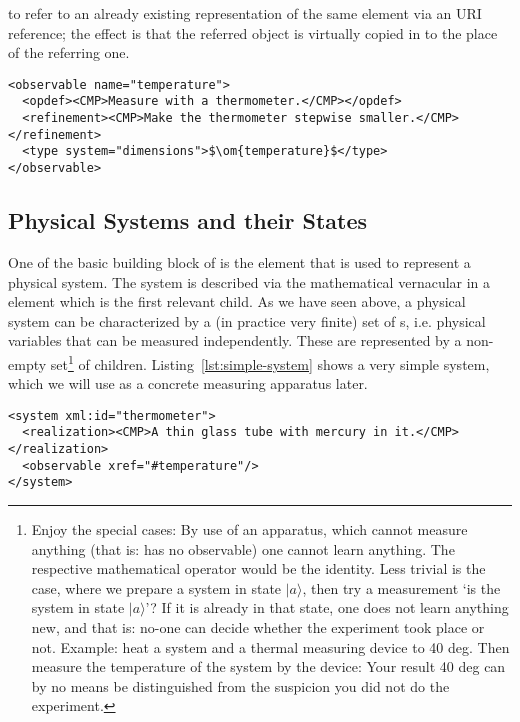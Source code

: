 to refer to an already existing representation of the same element via an URI reference;
the effect is that the referred object is virtually copied in to the place of the
referring one.

\begin{lstlisting}[label=lst:observable,mathescape,
  caption={An Observable for the Temperature},
  index={observable,opdef,refinement,type}]
<observable name="temperature">
  <opdef><CMP>Measure with a thermometer.</CMP></opdef>
  <refinement><CMP>Make the thermometer stepwise smaller.</CMP></refinement>
  <type system="dimensions">$\om{temperature}$</type>
</observable>
\end{lstlisting}


\subsection{Physical Systems and their States}\label{subsec:systems}

One of the basic building block of {\physml} is the {} element that is used
to represent a physical system. The system is described via the mathematical vernacular in
a {} element which is the first relevant child. As we have seen above,
a physical system can be characterized by a (in practice very finite) set of
{s}, i.e. physical variables that can be measured independently.
These are represented by a non-empty set\footnote{Enjoy the special cases: By use of an
  apparatus, which cannot measure anything (that is: has no observable) one cannot learn
  anything. The respective mathematical operator would be the identity.  Less trivial is
  the case, where we prepare a system in state $|a\rangle$, then try a measurement `is the
  system in state $|a\rangle$'? If it is already in that state, one does not learn
  anything new, and that is: no-one can decide whether the experiment took place or not.
  Example: heat a system and a thermal measuring device to 40 deg.  Then measure the
  temperature of the system by the device: Your result 40 deg can by no means be
  distinguished from the suspicion you did not do the experiment.}  of
{} children. Listing~\ref{lst:simple-system} shows a very simple
system, which we will use as a concrete measuring apparatus later.

\begin{lstlisting}[label=lst:simple-system,mathescape,
  caption={A Simple Physical System},
  index={theory,symbol}]
<system xml:id="thermometer">
  <realization><CMP>A thin glass tube with mercury in it.</CMP></realization>
  <observable xref="#temperature"/>
</system>
\end{lstlisting}

